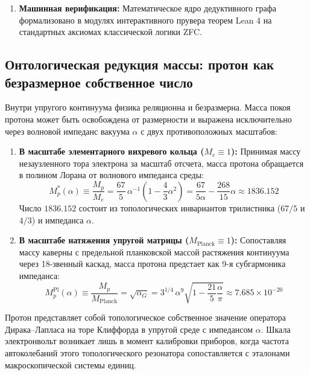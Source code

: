 \documentclass[11pt,a4paper]{article}
\theoremstyle{definition}
\theoremstyle{remark}
\begin{document}
\begin{enumerate}
\item \textbf{Машинная верификация:} Математическое ядро дедуктивного графа формализовано в модулях интерактивного прувера теорем Lean 4 на стандартных аксиомах классической логики ZFC.
\end{enumerate}

\subsection*{Онтологическая редукция массы: протон как безразмерное собственное число}

Внутри упругого континуума физика реляционна и безразмерна. Масса покоя протона может быть освобождена от размерности и выражена исключительно через волновой импеданс вакуума $\alpha$ с двух противоположных масштабов:

\begin{enumerate}
\item \textbf{В масштабе элементарного вихревого кольца ($M_e \equiv 1$):}
Принимая массу незаузленного тора электрона за масштаб отсчета, масса протона обращается в полином Лорана от волнового импеданса среды:
\begin{equation}
M_p^*(\alpha) \equiv \frac{M_p}{M_e} = \frac{67}{5} \, \alpha^{-1} \left( 1 - \frac{4}{3}\alpha^2 \right) = \frac{67}{5\alpha} - \frac{268}{15}\alpha \approx 1836.152
\label{eq:proton_mass_dimensionless_electron}
\end{equation}
Число $1836.152$ состоит из топологических инвариантов трилистника ($67/5$ и $4/3$) и импеданса $\alpha$.

\item \textbf{В масштабе натяжения упругой матрицы ($M_{\mathrm{Planck}} \equiv 1$):}
Сопоставляя массу каверны с предельной планковской массой растяжения континуума через 18-звенный каскад, масса протона предстает как 9-я субгармоника импеданса:
\begin{equation}
M_p^{\mathrm{Pl}}(\alpha) \equiv \frac{M_p}{M_{\mathrm{Planck}}} = \sqrt{\alpha_G} = 3^{1/4} \, \alpha^9 \sqrt{1 - \frac{21}{5}\frac{\alpha}{\pi}} \approx 7.685 \times 10^{-20}
\label{eq:proton_mass_dimensionless_planck}
\end{equation}
\end{enumerate}

Протон представляет собой топологическое собственное значение оператора Дирака--Лапласа на торе Клиффорда в упругой среде с импедансом $\alpha$. Шкала электронвольт возникает лишь в момент калибровки приборов, когда частота автоколебаний этого топологического резонатора сопоставляется с эталонами макроскопической системы единиц.
\end{document}
